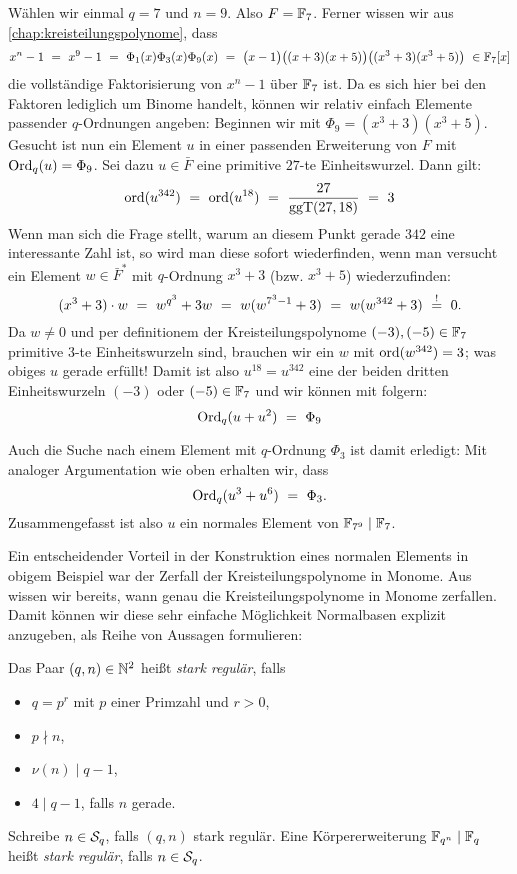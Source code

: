 \begin{beispiel}
  \label{bsp:stark_regular_1}
  Wählen wir einmal $q = 7$ und $n=9$. Also $F = \F_7$.
  Ferner wissen wir aus \autoref{chap:kreisteilungspolynome}, dass
  \[ x^n-1 \speq= x^9-1 \speq= 
    \Phi_1(x)\Phi_3(x)\Phi_9(x) \speq=
    \big(x-1\big)\big( (x+3)(x+5)\big)
    \big( (x^3+3)(x^3+5) \big) \ \in \F_7[x]\]
  die vollständige Faktorisierung von $x^n-1$ über $\F_7$ ist.
  Da es sich hier bei den Faktoren lediglich um Binome handelt, können wir
  relativ einfach Elemente passender $q$-Ordnungen angeben: Beginnen wir 
  mit $\Phi_9 = (x^3+3)(x^3+5)$. Gesucht ist nun ein Element $u$ in einer 
  passenden Erweiterung von $F$ mit $\Ord_q(u)= \Phi_9$.
  Sei dazu $u \in \bar F$ eine primitive $27$-te Einheitswurzel. Dann
  gilt:
  \[ \ord(u^{342}) \speq= \ord(u^{18}) \speq= \frac{27}{\ggT(27,18)} \speq= 3\]
  Wenn man sich die Frage stellt, warum an diesem Punkt gerade $342$ eine
  interessante Zahl ist, so wird man diese sofort wiederfinden, wenn man
  versucht ein Element $w\in \bar F^\ast$ mit $q$-Ordnung $x^3+3$ (bzw.
  $x^3+5$) wiederzufinden:
  \[ (x^3+3)\cdot w \speq= w^{q^3} + 3 w \speq= 
    w(w^{7^3-1} +3) \speq= w(w^{342}+3) \speq{\overset{!}{=}} 0.\]
  Da $w \neq 0$ und per definitionem der Kreisteilungspolynome 
  $(-3),(-5)\in \F_7$ primitive $3$-te Einheitswurzeln sind, 
  brauchen wir ein $w$ mit $\ord(w^{342}) = 3$; 
  was obiges $u$ gerade erfüllt! Damit ist also $u^{18} = u^{342}$ 
  eine der beiden dritten Einheitswurzeln $(-3)$ oder $(-5) \in \F_7$ und wir
  können mit  folgern:
  \[ \Ord_q(u + u^2) \speq= \Phi_9\]

  Auch die Suche nach einem Element mit $q$-Ordnung $\Phi_3$ ist damit
  erledigt: Mit analoger Argumentation wie oben erhalten wir, dass 
  \[ \Ord_q(u^{3} + u^{6}) \speq= \Phi_3.\]
  Zusammengefasst ist also $u$ ein normales Element von $\F_{7^9} \mid \F_7$.
\end{beispiel}

Ein entscheidender Vorteil in der Konstruktion eines normalen Elements in
obigem Beispiel war der Zerfall der Kreisteilungspolynome in Monome. Aus \TODO
wissen wir bereits, wann genau die Kreisteilungspolynome in Monome zerfallen.
Damit können wir diese sehr einfache Möglichkeit Normalbasen explizit anzugeben,
als Reihe von Aussagen formulieren:

\begin{definition}
  Das Paar $(q,n) \in \N^2$ heißt \emph{stark regulär}, falls
  \begin{itemize}
    \item $q = p^r$ mit $p$ einer Primzahl und $r>0$,
    \item $p \nmid n$,
    \item $\nu(n) \mid q-1$,
    \item $4 \mid q-1$, falls $n$ gerade.
  \end{itemize}
  Schreibe $n \in \S_q$, falls $(q,n)$ stark regulär.
  Eine Körpererweiterung $\F_{q^n} \mid \F_q$ heißt \emph{stark regulär}, falls
  $n \in \S_q$.
\end{definition}

